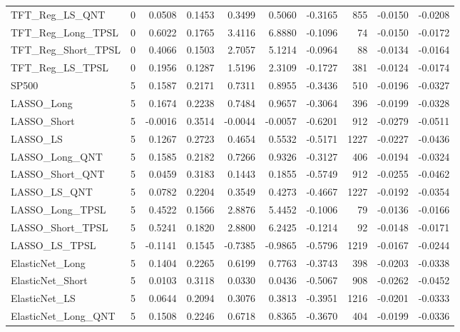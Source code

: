 \begin{tabular}{llrrrrrrrr}
\cline{1-10}
TFT\_Reg\_LS\_QNT & 0 & 0.0508 & 0.1453 & 0.3499 & 0.5060 & -0.3165 & 855 & -0.0150 & -0.0208 \\
\cline{1-10}
TFT\_Reg\_Long\_TPSL & 0 & 0.6022 & 0.1765 & 3.4116 & 6.8880 & -0.1096 & 74 & -0.0150 & -0.0172 \\
\cline{1-10}
TFT\_Reg\_Short\_TPSL & 0 & 0.4066 & 0.1503 & 2.7057 & 5.1214 & -0.0964 & 88 & -0.0134 & -0.0164 \\
\cline{1-10}
TFT\_Reg\_LS\_TPSL & 0 & 0.1956 & 0.1287 & 1.5196 & 2.3109 & -0.1727 & 381 & -0.0124 & -0.0174 \\
\cline{1-10}
SP500 & 5 & 0.1587 & 0.2171 & 0.7311 & 0.8955 & -0.3436 & 510 & -0.0196 & -0.0327 \\
\cline{1-10}
LASSO\_Long & 5 & 0.1674 & 0.2238 & 0.7484 & 0.9657 & -0.3064 & 396 & -0.0199 & -0.0328 \\
\cline{1-10}
LASSO\_Short & 5 & -0.0016 & 0.3514 & -0.0044 & -0.0057 & -0.6201 & 912 & -0.0279 & -0.0511 \\
\cline{1-10}
LASSO\_LS & 5 & 0.1267 & 0.2723 & 0.4654 & 0.5532 & -0.5171 & 1227 & -0.0227 & -0.0436 \\
\cline{1-10}
LASSO\_Long\_QNT & 5 & 0.1585 & 0.2182 & 0.7266 & 0.9326 & -0.3127 & 406 & -0.0194 & -0.0324 \\
\cline{1-10}
LASSO\_Short\_QNT & 5 & 0.0459 & 0.3183 & 0.1443 & 0.1855 & -0.5749 & 912 & -0.0255 & -0.0462 \\
\cline{1-10}
LASSO\_LS\_QNT & 5 & 0.0782 & 0.2204 & 0.3549 & 0.4273 & -0.4667 & 1227 & -0.0192 & -0.0354 \\
\cline{1-10}
LASSO\_Long\_TPSL & 5 & 0.4522 & 0.1566 & 2.8876 & 5.4452 & -0.1006 & 79 & -0.0136 & -0.0166 \\
\cline{1-10}
LASSO\_Short\_TPSL & 5 & 0.5241 & 0.1820 & 2.8800 & 6.2425 & -0.1214 & 92 & -0.0148 & -0.0171 \\
\cline{1-10}
LASSO\_LS\_TPSL & 5 & -0.1141 & 0.1545 & -0.7385 & -0.9865 & -0.5796 & 1219 & -0.0167 & -0.0244 \\
\cline{1-10}
ElasticNet\_Long & 5 & 0.1404 & 0.2265 & 0.6199 & 0.7763 & -0.3743 & 398 & -0.0203 & -0.0338 \\
\cline{1-10}
ElasticNet\_Short & 5 & 0.0103 & 0.3118 & 0.0330 & 0.0436 & -0.5067 & 908 & -0.0262 & -0.0452 \\
\cline{1-10}
ElasticNet\_LS & 5 & 0.0644 & 0.2094 & 0.3076 & 0.3813 & -0.3951 & 1216 & -0.0201 & -0.0333 \\
\cline{1-10}
ElasticNet\_Long\_QNT & 5 & 0.1508 & 0.2246 & 0.6718 & 0.8365 & -0.3670 & 404 & -0.0199 & -0.0336 \\

\end{tabular}
